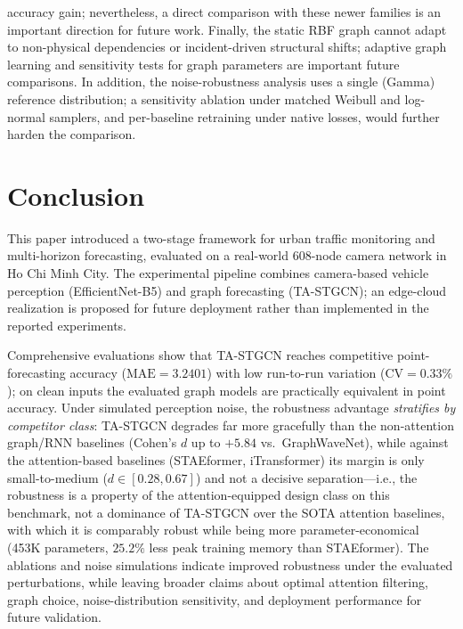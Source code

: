 \documentclass[a4paper,fleqn]{cas-sc}
\begin{document}
accuracy gain; nevertheless, a direct comparison with these newer families is an important direction for future work. Finally, the static RBF graph cannot adapt to non-physical dependencies or incident-driven structural shifts; adaptive graph learning and sensitivity tests for graph parameters are important future comparisons. In addition, the noise-robustness analysis uses a single (Gamma) reference distribution; a sensitivity ablation under matched Weibull and log-normal samplers, and per-baseline retraining under native losses, would further harden the comparison.

\section{Conclusion}
\label{sec:conclusion}

This paper introduced a two-stage framework for urban traffic monitoring and multi-horizon forecasting, evaluated on a real-world 608-node camera network in Ho Chi Minh City. The experimental pipeline combines camera-based vehicle perception (EfficientNet-B5) and graph forecasting (TA-STGCN); an edge-cloud realization is proposed for future deployment rather than implemented in the reported experiments.

Comprehensive evaluations show that TA-STGCN reaches competitive point-forecasting accuracy ($\text{MAE} = \mathbf{3.2401}$) with low run-to-run variation ($\text{CV}=0.33\%$); on clean inputs the evaluated graph models are practically equivalent in point accuracy. Under simulated perception noise, the robustness advantage \emph{stratifies by competitor class}: TA-STGCN degrades far more gracefully than the non-attention graph/RNN baselines (Cohen's $d$ up to $+5.84$ vs.\ GraphWaveNet), while against the attention-based baselines (STAEformer, iTransformer) its margin is only small-to-medium ($d \in [0.28, 0.67]$) and not a decisive separation---i.e., the robustness is a property of the attention-equipped design class on this benchmark, not a dominance of TA-STGCN over the SOTA attention baselines, with which it is comparably robust while being more parameter-economical (453K parameters, $25.2\%$ less peak training memory than STAEformer). The ablations and noise simulations indicate improved robustness under the evaluated perturbations, while leaving broader claims about optimal attention filtering, graph choice, noise-distribution sensitivity, and deployment performance for future validation.
\end{document}
